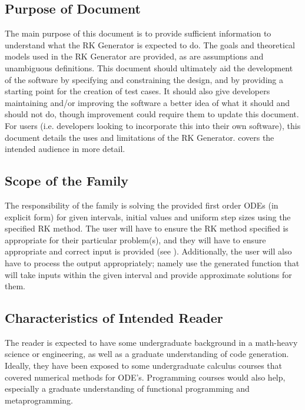 \documentclass[12pt]{article}
\newcommand{\famname}{RK Generator} %
\begin{document}
\subsection{Purpose of Document}
The main purpose of this document is to provide sufficient information to 
understand what the \famname{} is expected to do.
The goals and theoretical models used in the \famname{} are provided, as are 
assumptions and unambiguous definitions.
This document should ultimately aid the development of the software by 
specifying and constraining the design, and by providing a starting point for 
the creation of test cases.
It should also give developers maintaining and/or improving the software a 
better idea of what it should and should not do, though improvement could 
require them to update this document.
For users (i.e. developers looking to incorporate this into their own 
software), this document details the uses and limitations of the \famname{}.
 covers the intended audience in more detail.

\subsection{Scope of the Family}
The responsibility of the family is solving the provided first order ODEs (in 
explicit form) for given intervals, initial values and uniform step sizes using 
the specified RK method. The 
user will have to ensure the RK method specified is appropriate for their 
particular problem(s), and they will have to ensure appropriate and correct 
input is provided (see ). 
Additionally, the user will also have to process the output appropriately; 
namely use the generated function that will take inputs within the given 
interval and provide approximate solutions for them.

\subsection{Characteristics of Intended Reader}\label{ssec:intended-reader} 
The reader is expected to have some undergraduate background in a math-heavy 
science or engineering, as well as a graduate understanding of code generation. 
Ideally, they have been 
exposed to some undergraduate calculus courses that covered numerical methods 
for ODE's.
Programming courses would also help, especially a graduate understanding of 
functional programming and metaprogramming. 
\end{document}
